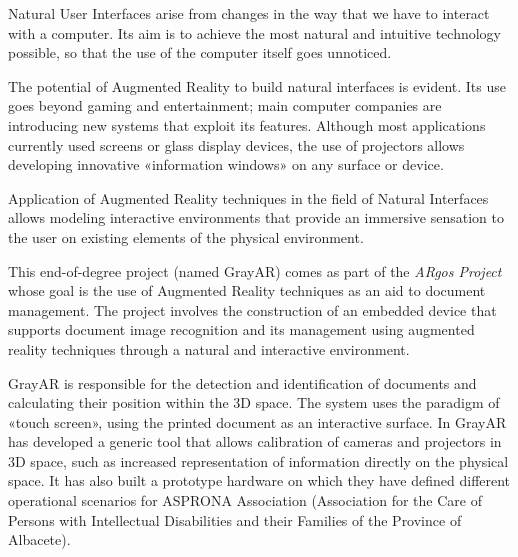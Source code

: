 Natural User Interfaces arise from changes in the way that we have to interact with a computer. Its aim is to achieve the most natural and intuitive technology possible, so that the use of the computer itself goes unnoticed.

The potential of Augmented Reality to build natural interfaces is evident. Its use goes beyond gaming and entertainment; main computer companies are introducing new systems that exploit its features. Although most applications currently used screens or glass display devices, the use of projectors allows developing innovative «information windows» on any surface or device.

Application of Augmented Reality techniques in the field of Natural Interfaces allows modeling interactive environments that provide an immersive sensation to the user on existing elements of the physical environment.

This end-of-degree project (named GrayAR) comes as part of the \textit{ARgos Project} whose goal is the use of Augmented Reality techniques as an aid to document management. The project involves the construction of an embedded device that supports document image recognition and its management using augmented reality techniques through a natural and interactive environment.

GrayAR is responsible for the detection and identification of documents and calculating their position within the 3D space. The system uses the paradigm of «touch screen», using the printed document as an interactive surface. In GrayAR has developed a generic tool that allows calibration of cameras and projectors in 3D space, such as increased representation of information directly on the physical space. It has also built a prototype hardware on which they have defined different operational scenarios for ASPRONA Association (Association for the Care of Persons with Intellectual Disabilities and their Families of the Province of Albacete).
